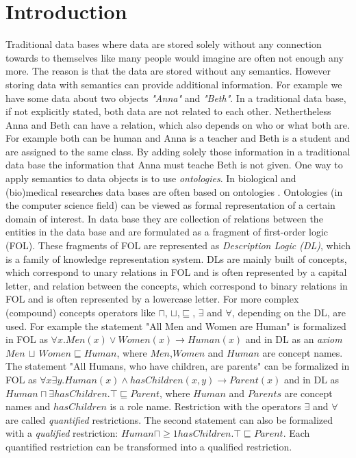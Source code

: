 \documentclass{book}
\theoremstyle{break}
\theoremstyle{definition}
\begin{document}
\chapter{Introduction}
Traditional data bases where data are stored solely without any connection towards to themselves like many people would imagine are often not enough any more. The reason is that the data are stored without any semantics. However storing data with semantics can provide additional information. For example we have some data about two objects \textit{"Anna"} and \textit{"Beth"}. In a traditional data base, if not explicitly stated, both data are not related to each other. Nethertheless Anna and Beth can have a relation, which also depends on who or what both are. For example both can be human and Anna is a teacher and Beth is a student and are assigned to the same class. By adding solely those information in a traditional data base the information that Anna must teache Beth is not given. One way to apply semantics to data objects is to use \textit{ontologies}. In biological and (bio)medical researches data bases are often based on ontologies \cite{bio}. Ontologies (in the computer science field) can be viewed as formal representation of a certain domain of interest. In data base they are collection of relations between the entities in the data base and are formulated as a fragment of first-order logic (FOL). These fragments of FOL are represented as \textit{Description Logic (DL)}, which is a family of knowledge representation system. DLs are mainly built of concepts, which correspond to unary relations in FOL and is often represented by a capital letter, and relation between the concepts, which correspond to binary relations in FOL and is often represented by a lowercase letter. For more complex (compound) concepts operators like $\sqcap$, $\sqcup$,$\sqsubseteq$, $\exists$ and $\forall$, depending on the DL, are used. For example the statement "All Men and Women are Human" is formalized in FOL as $\forall x.Men(x)\vee Women(x)\rightarrow Human(x)$ and in DL as an \textit{axiom} $Men\,\sqcup\, Women\sqsubseteq Human$, where $Men$,$Women$ and $Human$ are concept names. The statement "All Humans, who have children, are parents" can be formalized in FOL as $\forall x \exists y. Human(x)\wedge hasChildren(x,y)\rightarrow Parent(x)$ and in DL as $Human\sqcap \exists hasChildren.\top \sqsubseteq Parent$, where $Human$ and $Parents$ are concept names and $hasChildren$ is a role name. Restriction with the operators $\exists$ and $\forall$ are called \textit{quantified} restrictions. The second statement can also be formalized with a \textit{qualified} restriction: $Human\sqcap \geq 1 hasChildren.\top\sqsubseteq Parent$. Each quantified restriction can be transformed into a qualified restriction.\\
\end{document}
